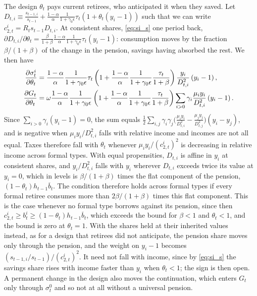 The design $\theta_t$ pays current retirees, who anticipated it when they saved. Let $D_{t,i} \equiv \frac{s_{t-1,i}}{s_{t-1}} + \frac{1-\alpha}{\alpha}\frac{1}{1+\gamma_0\epsilon} \tau_t \left(1+\theta_t(y_i-1)\right)$ such that we can write $c_{2,t}^i = R_ts_{t-1}D_{t,i}$. At consistent shares, \eqref{eq:si_s} one period back, $\partial D_{t,i}/\partial\theta_t = \frac{\beta}{1+\beta}\frac{1-\alpha}{\alpha}\frac{1}{1+\gamma_0\epsilon}\tau_t(y_i-1)$: consumption moves by the fraction $\beta/(1+\beta)$ of the change in the pension, savings having absorbed the rest. We then have 
\begin{align}
    \frac{\partial\sigma_t^i}{\partial\theta_t} &=   \frac{1-\alpha}{\alpha}\frac{1}{1+\gamma_0\epsilon}\tau_t\left(1+ \frac{1-\alpha}{\alpha}\frac{1}{1+\gamma_0\epsilon}\frac{\tau_t}{1+\beta}\right) \frac{y_i}{D_{t,i}^2}\left(y_i-1\right), \notag\\
    \frac{\partial G_t}{\partial\theta_t} &= \omega\frac{1-\alpha}{\alpha}\frac{1}{1+\gamma_0\epsilon}\left(1+ \frac{1-\alpha}{\alpha}\frac{1}{1+\gamma_0\epsilon}\frac{\tau_t}{1+\beta}\right)\sum_{i>0}\gamma_i\frac{\mu_iy_i}{D_{t,i}^2}\left(y_i-1\right). \label{eq:LOG:thetaEffect}
\end{align}
Since $\sum_{i>0}\gamma_i(y_i-1) = 0$, the sum equals $\frac{1}{2}\sum_{i,j}\gamma_i\gamma_j\big(\frac{\mu_iy_i}{D_{t,i}^2}-\frac{\mu_jy_j}{D_{t,j}^2}\big)(y_i-y_j)$, and is negative when $\mu_iy_i/D_{t,i}^2$ falls with relative income and incomes are not all equal. Taxes therefore fall with $\theta_t$ whenever $\mu_iy_i/(c_{2,t}^i)^2$ is decreasing in relative income across formal types. With equal propensities, $D_{t,i}$ is affine in $y_i$ at consistent shares, and $y_i/D_{t,i}^2$ falls with $y_i$ wherever $D_{t,i}$ exceeds twice its value at $y_i = 0$, which in levels is $\beta/(1+\beta)$ times the flat component of the pension, $(1-\theta_t)h_{t-1}\overline{b}_t$. The condition therefore holds across formal types if every formal retiree consumes more than $2\beta/(1+\beta)$ times this flat component. This is the case whenever no formal type borrows against its pension, since then $c_{2,t}^i \geq b_t^i \geq (1-\theta_t)h_{t-1}\overline{b}_t$, which exceeds the bound for $\beta < 1$ and $\theta_t < 1$, and the bound is zero at $\theta_t = 1$. With the shares held at their inherited values instead, as for a design that retirees did not anticipate, the pension share moves only through the pension, and the weight on $y_i-1$ becomes $(s_{t-1,i}/s_{t-1})/(c_{2,t}^i)^2$. It need not fall with income, since by \eqref{eq:si_s} the savings share rises with income faster than $y_i$ when $\theta_t < 1$; the sign is then open. A permanent change in the design also moves the continuation, which enters $G_t$ only through $\sigma_t^0$ and so not at all without a universal pension.



